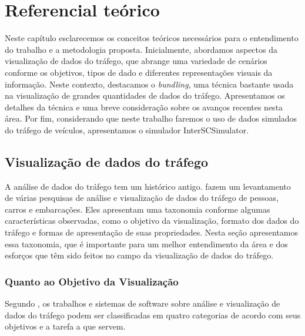 \chapter{Referencial teórico}
\label{cap:referencial-teorico}

  Neste capítulo esclarecemos os conceitos teóricos necessários para o
entendimento do trabalho e a metodologia proposta. Inicialmente, abordamos
aspectos da visualização de dados do tráfego, que abrange uma variedade de
cenários conforme os objetivos, tipos de dado e diferentes representações
visuais da informação. Neste contexto, destacamos o \emph{bundling}, uma
técnica bastante usada na visualização de grandes quantidades de dados do
tráfego. Apresentamos os detalhes da técnica e uma breve consideração sobre os
avanços recentes nesta área. Por fim, considerando que neste trabalho faremos o
uso de dados simulados do tráfego de veículos, apresentamos o simulador
InterSCSimulator.

\section{Visualização de dados do tráfego}
\label{sec:viz-trafego}

  A análise de dados do tráfego tem um histórico antigo. \citet{Chen2015} fazem
um levantamento de várias pesquisas de análise e visualização de dados do
tráfego de pessoas, carros e embarcações. Eles apresentam uma taxonomia
conforme algumas características observadas, como o objetivo da visualização,
formato dos dados do tráfego e formas de apresentação de suas propriedades.
Nesta seção apresentamos essa taxonomia, que é importante para um melhor
entendimento da área e dos esforços que têm sido feitos no campo da
visualização de dados do tráfego.

\subsection{Quanto ao Objetivo da Visualização}

  Segundo \citet{Chen2015}, os trabalhos e sistemas de software sobre análise e
visualização de dados do tráfego podem ser classificadas em quatro categorias
de acordo com seus objetivos e a tarefa a que servem.

